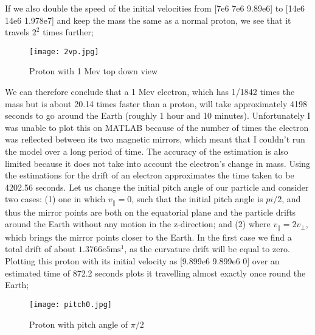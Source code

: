 \documentclass[14paper,11pt,hidelinks]{article}
\begin{document}
\FloatBarrier 
\noindent
If we also double the speed of the initial velocities from [7e6 7e6 9.89e6]  to [14e6 14e6 1.978e7] and keep the mass the same as a normal proton, we see that it travels \begin{math} 2^2\end{math} times further;
\begin{figure}[h!]
\centering
\texttt{[image: 2vp.jpg]} 
\caption{Proton with 1 Mev top down view}
\end{figure}
\FloatBarrier
\noindent
We can therefore conclude that a 1 Mev electron, which has 1/1842 times the mass but is about 20.14 times faster than a proton, will take approximately 4198 seconds to go around the Earth (roughly 1 hour and 10 minutes). Unfortunately I was unable to plot this on MATLAB because of the number of times the electron was reflected between its two magnetic mirrors, which meant that I couldn't run the model over a long period of time. The accuracy of the estimation is also limited because it does not take into account the electron's change in mass. Using the estimations for the drift of an electron approximates the time taken to be 4202.56 seconds.
\newline
\newline
 Let us change the initial pitch angle of our particle and consider two cases: (1) one in which \begin{math}v_\parallel=0\end{math}, such that the initial pitch angle is \begin{math}pi/2 \end{math}, and thus the mirror points are both on the equatorial plane and the particle drifts around the Earth without any motion in the z-direction; and (2) where \begin{math}v_\parallel=2v_\bot\end{math}, which brings the mirror points closer to the Earth. In the first case we find a total drift of about \begin{math} 1.3766e5 \mbox{ms}^{1}\end{math}, as the curvature drift will be equal to zero. Plotting this proton with its initial velocity as [9.899e6 9.899e6 0] over an estimated time of 872.2 seconds plots it travelling almost exactly once round the Earth;
 \begin{figure}[h!]
\centering
\texttt{[image: pitch0.jpg]} 
\caption{Proton with pitch angle of $\pi/2$}
\end{figure}
\FloatBarrier
\noindent
\end{document}
